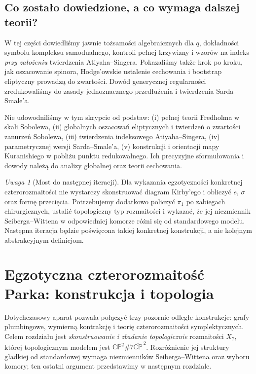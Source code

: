 \documentclass[11pt,a4paper]{report}
\numberwithin{equation}{section}
\theoremstyle{plain}
\theoremstyle{definition}
\theoremstyle{remark}
\newtheorem{uwaga}[twierdzenie]{Uwaga}
\begin{document}
\section{Co zostało dowiedzione, a co wymaga dalszej teorii?}
\label{sec:tg-sw12-scope}

W tej części dowiedliśmy jawnie tożsamości algebraicznych
dla $q$, dokładności symbolu kompleksu samodualnego,
kontroli pełnej krzywizny i wzorów na indeks
\emph{przy założeniu} twierdzenia Atiyaha--Singera.
Pokazaliśmy także krok po kroku, jak oszacowanie spinora,
Hodge'owskie ustalenie cechowania i bootstrap eliptyczny
prowadzą do zwartości. Dowód generycznej regularności
zredukowaliśmy do zasady jednoznacznego przedłużenia
i twierdzenia Sarda--Smale'a.

Nie udowodniliśmy w tym skrypcie od podstaw:
(i) pełnej teorii Fredholma w skali Sobolewa,
(ii) globalnych oszacowań eliptycznych i twierdzeń o
zwartości zanurzeń Sobolewa,
(iii) twierdzenia indeksowego Atiyaha--Singera,
(iv) parametrycznej wersji Sarda--Smale'a,
(v) konstrukcji i orientacji mapy Kuranishiego
w pobliżu punktu redukowalnego. Ich precyzyjne
sformułowania i dowody należą do analizy globalnej
oraz teorii cechowania.

\begin{uwaga}[Most do następnej iteracji]
Dla wykazania egzotyczności konkretnej czterorozmaitości
nie wystarczy skonstruować diagram Kirby'ego i obliczyć
$e$, $\sigma$ oraz formę przecięcia. Potrzebujemy dodatkowo
policzyć $\pi_1$ po zabiegach chirurgicznych,
ustalić topologiczny typ rozmaitości i wykazać, że
jej niezmiennik Seiberga--Wittena w odpowiedniej
komorze różni się od standardowego modelu.
Następna iteracja będzie poświęcona takiej konkretnej
konstrukcji, a nie kolejnym abstrakcyjnym definicjom.
\end{uwaga}


\chapter{Egzotyczna czterorozmaitość Parka: konstrukcja i topologia}
\label{ch:tg-park}

Dotychczasowy aparat pozwala połączyć trzy pozornie odległe
konstrukcje: grafy plumbingowe, wymierną kontrakcję i teorię
czterorozmaitości symplektycznych. Celem rozdziału jest
\emph{skonstruowanie i zbadanie topologicznie} rozmaitości
$X_7$, której topologicznym modelem jest
$\mathbb{CP}^{2}\#7\overline{\mathbb{CP}}^{\,2}$.
Rozróżnienie jej struktury gładkiej od standardowej wymaga
niezmienników Seiberga--Wittena oraz wyboru komory; ten
ostatni argument przedstawimy w następnym rozdziale.
\end{document}
